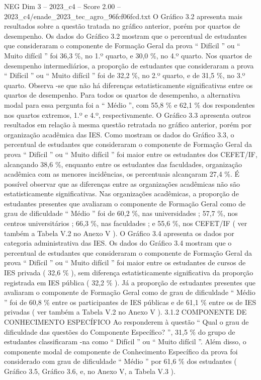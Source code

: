 \begin{textsample}{NEG Dim 3 – 2023\_c4 – Score 2.00 – 2023\_c4/enade\_2023\_tec\_agro\_96fcf06fcd.txt}
O Gráfico 3.2 apresenta mais resultados sobre a questão tratada no gráfico anterior, porém por quartos de desempenho.
Os dados do Gráfico 3.2 mostram que o percentual de estudantes que consideraram o componente de Formação Geral da prova “ Difícil ” ou “ Muito difícil ” foi 36,3 \%, no 1.º quarto, e 30,0 \%, no 4.º quarto.
Nos quartos de desempenho intermediários, a proporção de estudantes que consideraram a prova “ Difícil ” ou “ Muito difícil ” foi de 32,2 \%, no 2.º quarto, e de 31,5 \%, no 3.º quarto.
Observa -se que não há diferenças estatisticamente significativas entre os quartos de desempenho.
Para todos os quartos de desempenho, a alternativa modal para essa pergunta foi a “ Médio ”, com 55,8 \% e 62,1 \% dos respondentes nos quartos extremos, 1.º e 4.º, respectivamente.
O Gráfico 3.3 apresenta outros resultados em relação à mesma questão retratada no gráfico anterior, porém por organização acadêmica das IES.
Como mostram os dados do Gráfico 3.3, o percentual de estudantes que consideraram o componente de Formação Geral da prova “ Difícil ” ou “ Muito difícil ” foi maior entre os estudantes dos CEFET/IF, alcançando 38,6 \%, enquanto entre os estudantes das faculdades, organização acadêmica com as menores incidências, os percentuais alcançaram 27,4 \%.
É possível observar que as diferenças entre as organizações acadêmicas não são estatisticamente significativas.
Nas organizações acadêmicas, a proporção de estudantes presentes que avaliaram o componente de Formação Geral como de grau de dificuldade “ Médio ” foi de 60,2 \%, nas universidades ; 57,7 \%, nos centros universitários ; 66,3 \%, nas faculdades ; e 55,6 \%, nos CEFET/IF ( ver também a Tabela V.2 no Anexo V ).
O Gráfico 3.4 apresenta os dados por categoria administrativa das IES.
Os dados do Gráfico 3.4 mostram que o percentual de estudantes que consideraram o componente de Formação Geral da prova “ Difícil ” ou “ Muito difícil ” foi maior entre os estudantes de cursos de IES privada ( 32,6 \% ), sem diferença estatisticamente significativa da proporção registrada em IES pública ( 32,2 \% ).
Já a proporção de estudantes presentes que avaliaram o componente de Formação Geral como de grau de dificuldade “ Médio ” foi de 60,8 \% entre os participantes de IES públicas e de 61,1 \% entre os de IES privadas ( ver também a Tabela V.2 no Anexo V ). 3.1.2 COMPONENTE DE CONHECIMENTO ESPECÍFICO Ao responderem à questão “ Qual o grau de dificuldade das questões do Componente Específico? ”, 31,5 \% do grupo de estudantes classificaram -na como “ Difícil ” ou “ Muito difícil ”.
Além disso, o componente modal de componente de Conhecimento Específico da prova foi considerado com grau de dificuldade “ Médio ” por 61,6 \% dos estudantes ( Gráfico 3.5, Gráfico 3.6, e, no Anexo V, a Tabela V.3 ).

\end{textsample}
